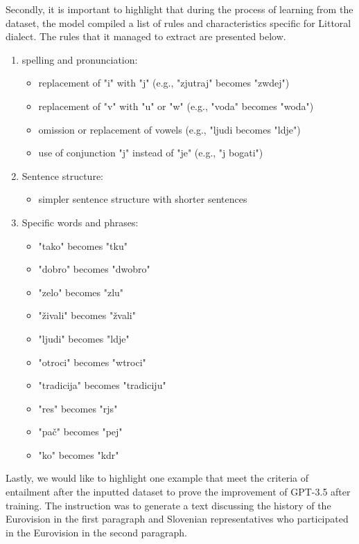\documentclass[fleqn,moreauthors,10pt]{ds_report}
\begin{document}
\vspace{\baselineskip}

Secondly, it is important to highlight that during the process of learning from the dataset, the model compiled a list of rules and characteristics specific for Littoral dialect. The rules that it managed to extract are presented below. 

\begin{enumerate}
    \item spelling and pronunciation:
    \begin{itemize}
        \item replacement of "i" with "j" (e.g., "zjutraj" becomes "zwdej")
        \item replacement of "v" with "u" or "w" (e.g., "voda" becomes "woda")
        \item omission or replacement of vowels (e.g.,  "ljudi becomes "ldje")
        \item use of conjunction "j" instead of "je" (e.g., "j bogati")


    \end{itemize}
    \item Sentence structure:
    \begin{itemize}
        \item simpler sentence structure with shorter sentences
    \end{itemize}
\item Specific words and phrases:
\begin{itemize}
    \item  "tako"  becomes "tku"
    \item "dobro" becomes "dwobro"
    \item "zelo" becomes "zlu"
    \item "živali" becomes "žvali"
    \item "ljudi" becomes "ldje"
    \item "otroci" becomes "wtroci"
    \item "tradicija" becomes "tradiciju"
    \item "res" becomes "rjs"
    \item "pač" becomes "pej"
    \item "ko" becomes "kdr"
\end{itemize}
\end{enumerate}

Lastly, we would like to highlight one example that meet the criteria of entailment after the inputted dataset to prove the improvement of GPT-3.5 after training. The instruction was to generate a text discussing the history of the Eurovision in the first paragraph and Slovenian representatives who participated in the Eurovision in the second paragraph. 
\end{document}
